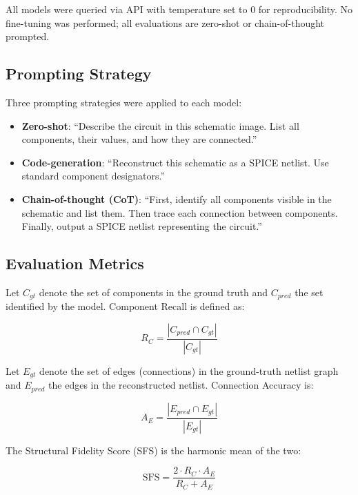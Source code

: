 \documentclass[conference]{IEEEtran}
\begin{document}
All models were queried via API with temperature set to 0 for reproducibility. No fine-tuning was performed; all evaluations are zero-shot or chain-of-thought prompted.

\subsection{Prompting Strategy}

Three prompting strategies were applied to each model:

\begin{itemize}
    \item \textbf{Zero-shot}: ``Describe the circuit in this schematic image. List all components, their values, and how they are connected.''
    \item \textbf{Code-generation}: ``Reconstruct this schematic as a SPICE netlist. Use standard component designators.''
    \item \textbf{Chain-of-thought (CoT)}: ``First, identify all components visible in the schematic and list them. Then trace each connection between components. Finally, output a SPICE netlist representing the circuit.''
\end{itemize}

\subsection{Evaluation Metrics}

Let $C_{gt}$ denote the set of components in the ground truth and $C_{pred}$ the set identified by the model. Component Recall is defined as:

\begin{equation}
R_C = \frac{|C_{pred} \cap C_{gt}|}{|C_{gt}|}
\label{eq:recall}
\end{equation}

Let $E_{gt}$ denote the set of edges (connections) in the ground-truth netlist graph and $E_{pred}$ the edges in the reconstructed netlist. Connection Accuracy is:

\begin{equation}
A_E = \frac{|E_{pred} \cap E_{gt}|}{|E_{gt}|}
\label{eq:accuracy}
\end{equation}

The Structural Fidelity Score (SFS) is the harmonic mean of the two:

\begin{equation}
\text{SFS} = \frac{2 \cdot R_C \cdot A_E}{R_C + A_E}
\label{eq:sfs}
\end{equation}
\end{document}
